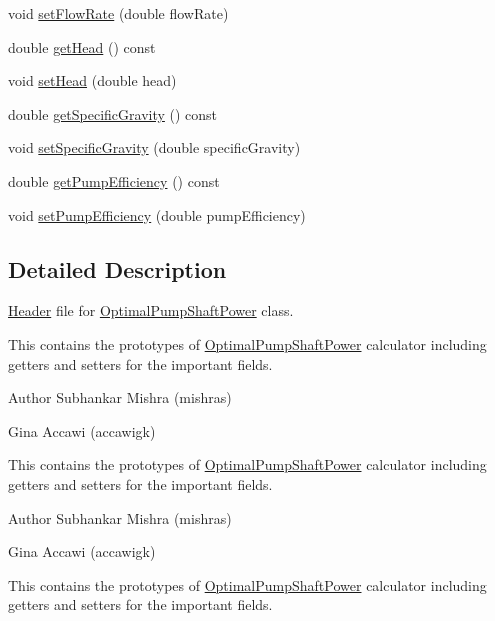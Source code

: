 \begin{DoxyCompactItemize}
\item 
void \hyperlink{class_optimal_pump_shaft_power_a38efdee39db4c3856915f1ab26d44ed2}{set\+Flow\+Rate} (double flow\+Rate)
\item 
double \hyperlink{class_optimal_pump_shaft_power_abb285a8a256c10187113c34db1a4462b}{get\+Head} () const
\item 
void \hyperlink{class_optimal_pump_shaft_power_aa080c62ff92fc70a4e27e7710e490b62}{set\+Head} (double head)
\item 
double \hyperlink{class_optimal_pump_shaft_power_a607d32c56edece639e03007adc1bf325}{get\+Specific\+Gravity} () const
\item 
void \hyperlink{class_optimal_pump_shaft_power_aa565a332e4b144c8eb85fd06c541199e}{set\+Specific\+Gravity} (double specific\+Gravity)
\item 
double \hyperlink{class_optimal_pump_shaft_power_a77b9c639438f9d6008c20948f173a2c4}{get\+Pump\+Efficiency} () const
\item 
void \hyperlink{class_optimal_pump_shaft_power_a2cb2c6b537c7db0bc5071f09c66308d0}{set\+Pump\+Efficiency} (double pump\+Efficiency)
\end{DoxyCompactItemize}


\subsection{Detailed Description}
\hyperlink{class_header}{Header} file for \hyperlink{class_optimal_pump_shaft_power}{Optimal\+Pump\+Shaft\+Power} class. 

This contains the prototypes of \hyperlink{class_optimal_pump_shaft_power}{Optimal\+Pump\+Shaft\+Power} calculator including getters and setters for the important fields.

\begin{DoxyAuthor}{Author}
Subhankar Mishra (mishras) 

Gina Accawi (accawigk) 
\end{DoxyAuthor}


This contains the prototypes of \hyperlink{class_optimal_pump_shaft_power}{Optimal\+Pump\+Shaft\+Power} calculator including getters and setters for the important fields.

\begin{DoxyAuthor}{Author}
Subhankar Mishra (mishras) 

Gina Accawi (accawigk) 
\end{DoxyAuthor}


This contains the prototypes of \hyperlink{class_optimal_pump_shaft_power}{Optimal\+Pump\+Shaft\+Power} calculator including getters and setters for the important fields.

